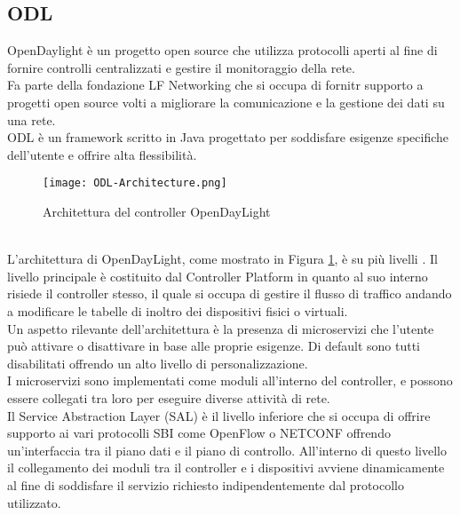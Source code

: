 \subsection{ODL}
OpenDaylight\cite{ODL} è un progetto open source che utilizza protocolli aperti al fine di fornire controlli centralizzati e gestire il monitoraggio della rete.
\\Fa parte della fondazione LF Networking \cite{LFN} che si occupa di fornitr supporto a progetti open source volti a migliorare la comunicazione e la gestione dei dati su una rete.
\\ODL è un framework scritto in Java progettato per soddisfare esigenze specifiche dell'utente e offrire alta flessibilità. 
\begin{figure}[h]
    \centering
   \texttt{[image: ODL-Architecture.png]}
    \caption{Architettura del controller OpenDayLight \cite{archodl}}
    \label{fig:ArchODL}
\end{figure}
\\L'architettura di OpenDayLight, come mostrato in Figura \ref{fig:ArchODL}, è su più livelli \cite{tesiodl}. 
Il livello principale è costituito dal Controller Platform in quanto al suo interno risiede il controller stesso, il quale si 
occupa di gestire il flusso di traffico andando a modificare le tabelle di inoltro dei dispositivi fisici o virtuali. 
\\Un aspetto rilevante dell'architettura è la presenza di microservizi che l'utente può attivare o disattivare in base alle proprie esigenze.
Di default sono tutti disabilitati offrendo un alto livello di personalizzazione.
\\I microservizi sono implementati come moduli all'interno del controller, e possono essere collegati tra loro per eseguire diverse attività di rete. 
\\Il Service Abstraction Layer (SAL) è il livello inferiore che si occupa di offrire supporto ai vari protocolli SBI come OpenFlow o NETCONF offrendo un'interfaccia tra il piano dati e il piano di controllo. 
All'interno di questo livello il collegamento dei moduli tra il controller e i dispositivi avviene dinamicamente al fine di soddisfare il servizio richiesto indipendentemente dal protocollo utilizzato.
